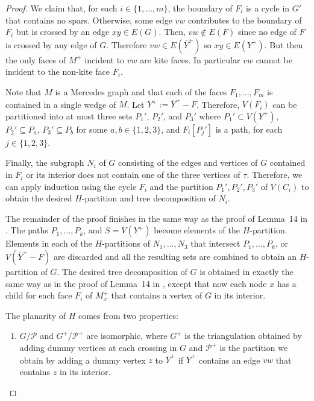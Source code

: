 \documentclass{patmorin}
\begin{document}
\begin{proof}
  We claim that, for each $i\in\{1,\ldots,m\}$, the boundary of $F_i$ is a cycle in $G'$ that contains no spars. Otherwise, some edge $vw$ contributes to the boundary of $F_i$ but is crossed by an edge $xy\in E(G)$. Then, $vw\not\in E(F)$ since no edge of $F$ is crossed by any edge of $G$. Therefore $vw\in E(\overline{Y}^+)$ so $xy\in E(Y^+)$. But then the only faces of $M^+$ incident to $vw$ are kite faces.  In particular $vw$ cannot be incident to the non-kite face $F_i$.
  
  Note that $M$ is a Mercedes graph and that each of the faces $F_1,\ldots,F_m$ is contained in a single wedge of $M$.   Let $Y^+ := \overline{Y}^+-F$. Therefore, $V(F_i)$ can be partitioned into at most three sets $P_1'$, $P_2'$, and $P_3'$ where $P_1'\subset V(Y^+)$, $P_2'\subseteq P_a$, $P_3'\subseteq P_b$ for some $a,b\in\{1,2,3\}$, and $F_i[P_j']$ is a path, for each $j\in\{1,2,3\}$. 

  Finally, the subgraph $N_i$ of $G$ consisting of the edges and vertices of $G$ contained in $F_i$ or its interior does not contain one of the three vertices of $\tau$. Therefore, we can apply induction using the cycle $F_i$ and the partition $P_1',P_2',P_3'$ of $V(C_i)$ to obtain the desired $H$-partition and tree decomposition of $N_i$.
  
  The remainder of the proof finishes in the same way as the proof of Lemma~14 in \cite{dujmovic.joret.ea:planar}.  The paths $P_1,\ldots,P_k$, and $S=V(Y^+)$ become elements of the $H$-partition.  Elements in each of the $H$-partitions of $N_1,\ldots,N_3$ that intersect $P_1,\ldots,P_k$, or $V(\overline{Y}^+-F)$ are discarded and all the resulting sets are combined to obtain an $H$-partition of $G$.  The desired tree decomposition of $G$ is obtained in exactly the same way as in the proof of Lemma~14 in \cite{dujmovic.joret.ea:planar}, except that now each node $x$ has a child for each face $F_i$ of $M^+_x$ that contains a vertex of $G$ in its interior.
  
  The planarity of $H$ comes from two properties:
  \begin{enumerate}
    \item $G/\mathcal{P}$ and $G^+/\mathcal{P^+}$ are isomorphic, where $G^+$ is the triangulation obtained by adding dummy vertices at each crossing in $G$ and $\mathcal{P}^+$ is the partition we obtain by adding a dummy vertex $z$ to $\overline{Y}^+$ if $\overline{Y}^+$ contains an edge $vw$ that contains $z$ in its interior.  
    

\end{enumerate}
\end{proof}
\end{document}
